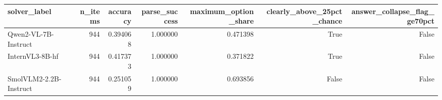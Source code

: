 \begin{tabular}{lrrrrrr}
\toprule
solver\_label & n\_items & accuracy & parse\_success & maximum\_option\_share & clearly\_above\_25pct\_chance & answer\_collapse\_flag\_ge70pct \\
\midrule
Qwen2-VL-7B-Instruct & 944 & 0.394068 & 1.000000 & 0.471398 & True & False \\
InternVL3-8B-hf & 944 & 0.417373 & 1.000000 & 0.371822 & True & False \\
SmolVLM2-2.2B-Instruct & 944 & 0.251059 & 1.000000 & 0.693856 & False & False \\
\bottomrule
\end{tabular}
